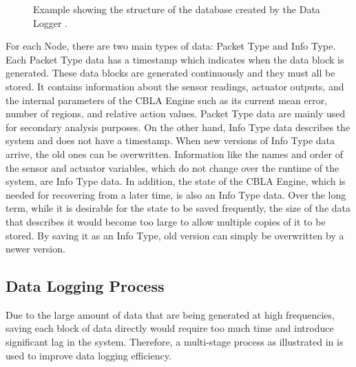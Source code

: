 \begin{figure}
	\caption[Structure of the database created by Data Logger]{Example showing the structure of the database created by the Data Logger .}
	\label{fig:data_structure}
\end{figure}

For each Node, there are two main types of data: Packet Type and Info Type. Each Packet Type data has a timestamp which indicates when the data block is generated. These data blocks are generated continuously and they must all be stored. It contains information about the sensor readings, actuator outputs, and the internal parameters of the CBLA Engine such as its current mean error, number of regions, and relative action values. Packet Type data are mainly used for secondary analysis purposes. On the other hand, Info Type data describes the system and does not have a timestamp. When new versions of Info Type data arrive, the old ones can be overwritten. Information like the names and order of the sensor and actuator variables, which do not change over the runtime of the system, are Info Type data. In addition, the state of the CBLA Engine, which is needed for recovering from a later time, is also an Info Type data. Over the long term, while it is desirable for the state to be saved frequently, the size of the data that describes it would become too large to allow multiple copies of it to be stored. By saving it as an Info Type, old version can simply be overwritten by a newer version.

\subsection{Data Logging Process}

Due to the large amount of data that are being generated at high frequencies, saving each block of data directly would require too much time and introduce significant lag in the system. Therefore, a multi-stage process as illustrated in  is used to improve data logging efficiency.

